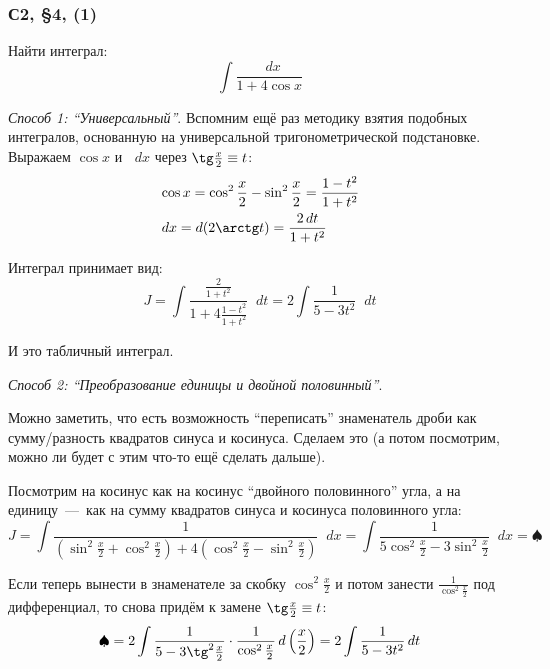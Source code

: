 \documentclass[a4paper,12pt]{article}
\newcommand{\diff}{\mathop{}\!d}
\begin{document}
  \subsubsection{С2, \S 4, (1)}

  Найти интеграл:
  \begin{equation}
    \int \frac{\diff x}{1 + 4 \cos x}
  \end{equation}
  
  \begin{solution}
    \emph{Способ 1: ``Универсальный''}.
    Вспомним ещё раз методику взятия подобных интегралов, основанную на универсальной тригонометрической подстановке.
    Выражаем $\cos x$ и $\diff x$ через $\tg \frac{x}{2} \hm\equiv t$:
    \[
      \begin{aligned}
        &\cos x = \cos^2\frac{x}{2} - \sin^2\frac{x}{2} = \frac{1 - t^2}{1 + t^2}\\
        &\diff x = \diff (2\arctg t) = \frac{2 \diff t}{1 + t^2}
      \end{aligned}
    \]

    Интеграл принимает вид:
    \[
      J = \int \frac{\frac{2}{1 + t^2}}{1 + 4\frac{1 - t^2}{1 + t^2}} \diff t
      = 2\int \frac{1}{5 - 3t^2} \diff t
    \]

    И это табличный интеграл.

    \medskip

    \noindent
    \emph{Способ 2: ``Преобразование единицы и двойной половинный''}.

    Можно заметить, что есть возможность ``переписать'' знаменатель дроби как сумму/разность квадратов синуса и косинуса.
    Сделаем это (а потом посмотрим, можно ли будет с этим что-то ещё сделать дальше).

    Посмотрим на косинус как на косинус ``двойного половинного'' угла, а на единицу~---~как на сумму квадратов синуса и косинуса половинного угла:
    \[
      J = \int \frac{1}{\left(\sin^2 \frac{x}{2} + \cos^2 \frac{x}{2}\right) + 4\left(\cos^2 \frac{x}{2} - \sin^2 \frac{x}{2}\right)} \diff x
      = \int \frac{1}{5 \cos^2 \frac{x}{2} - 3 \sin^2 \frac{x}{2}} \diff x = \spadesuit
    \]

    Если теперь вынести в знаменателе за скобку $\cos^2 \frac{x}{2}$ и потом занести $\frac{1}{\cos^2 \frac{x}{2}}$ под дифференциал, то снова придём к замене $\tg \frac{x}{2} \hm\equiv t$:
    \[
      \spadesuit = 2\int \frac{1}{5 - 3 \tg ^2 \frac{x}{2}} \cdot \frac{1}{\cos^2\frac{x}{2}} \diff \left(\frac{x}{2}\right) = 2 \int \frac{1}{5 - 3t^2} \diff t
    \]
  \end{solution}
\end{document}
